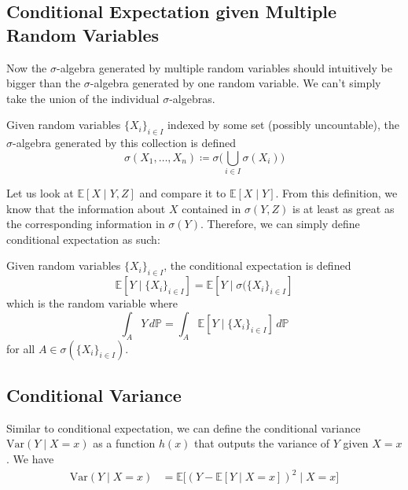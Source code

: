 \subsection{Conditional Expectation given Multiple Random Variables}

  Now the $\sigma$-algebra generated by multiple random variables should intuitively be bigger than the $\sigma$-algebra generated by one random variable. We can't simply take the union of the individual $\sigma$-algebras. 

  \begin{definition}
    Given random variables $\{X_i\}_{i \in I}$ indexed by some set (possibly uncountable), the $\sigma$-algebra generated by this collection is defined 
    \begin{equation}
      \sigma(X_1, \ldots, X_n) \coloneqq \sigma \bigg( \bigcup_{i \in I} \sigma(X_i) \bigg)
    \end{equation}
  \end{definition}

  Let us look at $\mathbb{E}[X \mid Y, Z]$ and compare it to $\mathbb{E}[X \mid Y]$. From this definition, we know that the information about $X$ contained in $\sigma(Y, Z)$ is at least as great as the corresponding information in $\sigma(Y)$. Therefore, we can simply define conditional expectation as such: 

  \begin{definition}
    Given random variables $\{X_i\}_{i \in I}$, the conditional expectation is defined 
    \begin{equation}
      \mathbb{E}[Y \mid \{X_i\}_{i \in I} ] = \mathbb{E}[ Y \mid \sigma(\{X_i \}_{i \in I}]
    \end{equation}
    which is the random variable where 
    \begin{equation}
      \int_A Y \, d\mathbb{P} = \int_A \mathbb{E}[Y \mid \{X_i\}_{i \in I} ] \, d\mathbb{P}
    \end{equation}
    for all $A \in \sigma(\{X_i \}_{i \in I})$. 
  \end{definition}

\subsection{Conditional Variance}

  Similar to conditional expectation, we can define the conditional variance $\mathrm{Var}(Y \mid X = x)$ as a function $h(x)$ that outputs the variance of $Y$ given $X = x$. We have
  \begin{align}
    \mathrm{Var}(Y \mid X = x) & = \mathbb{E}\big[ ( Y - \mathbb{E}[Y \mid X = x] )^2 \mid X = x \big]
  \end{align}

